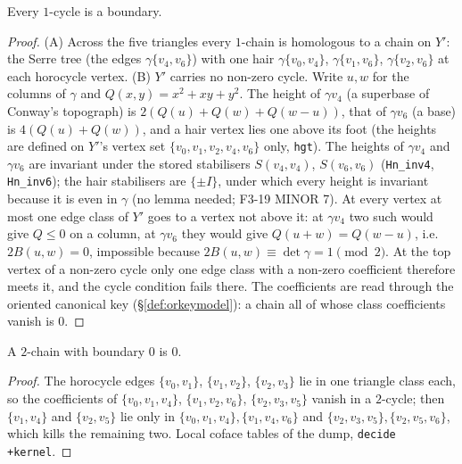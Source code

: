 \begin{lemma}[H4(ii)-(1) for the model: $H_1(X_{\mathrm{bulk}})=0$]\label{prop:model7h4-ii-1}
  \leanok
  Every $1$-cycle is a boundary.
\end{lemma}
\begin{proof}
  \leanok
  (A) Across the five triangles every $1$-chain is homologous to a chain on $Y'$: the Serre tree (the edges
  $\gamma\{v_4,v_6\}$) with one hair $\gamma\{v_0,v_4\}$, $\gamma\{v_1,v_6\}$, $\gamma\{v_2,v_6\}$ at each horocycle vertex.
  (B) $Y'$ carries no non-zero cycle. Write $u,w$ for the columns of $\gamma$ and $Q(x,y)=x^2+xy+y^2$. The height of
  $\gamma v_4$ (a superbase of Conway's topograph) is $2(Q(u)+Q(w)+Q(w-u))$, that of $\gamma v_6$ (a base) is $4(Q(u)+Q(w))$,
  and a hair vertex lies one above its foot (the heights are defined on $Y'$'s vertex set $\{v_0,v_1,v_2,v_4,v_6\}$ only,
  \texttt{hgt}). The heights of $\gamma v_4$ and $\gamma v_6$ are invariant under the stored stabilisers $S(v_4,v_4)$,
  $S(v_6,v_6)$ (\texttt{Hn\_inv4}, \texttt{Hn\_inv6}); the hair stabilisers are $\{\pm I\}$, under which every height is
  invariant because it is even in $\gamma$ (no lemma needed; F3-19 MINOR 7). At every vertex at most
  one edge class of $Y'$ goes to a vertex not above it: at $\gamma v_4$ two such would give $Q\le0$ on a column, at
  $\gamma v_6$ they would give $Q(u+w)=Q(w-u)$, i.e.\ $2B(u,w)=0$, impossible because $2B(u,w)\equiv\det\gamma=1\pmod 2$. At
  the top vertex of a non-zero cycle only one edge class with a non-zero coefficient therefore meets it, and the cycle
  condition fails there. The coefficients are read through the oriented canonical key (\S\ref{def:orkeymodel}): a chain all
  of whose class coefficients vanish is $0$.
\end{proof}

\begin{lemma}[H4(ii)-(2) for the model: $Z_2(X_{\mathrm{bulk}})=0$]\label{prop:model7h4-ii-2}
  \leanok
  A $2$-chain with boundary $0$ is $0$.
\end{lemma}
\begin{proof}
  \leanok
  The horocycle edges $\{v_0,v_1\}$, $\{v_1,v_2\}$, $\{v_2,v_3\}$ lie in one triangle class each, so the coefficients of
  $\{v_0,v_1,v_4\}$, $\{v_1,v_2,v_6\}$, $\{v_2,v_3,v_5\}$ vanish in a $2$-cycle; then $\{v_1,v_4\}$ and $\{v_2,v_5\}$ lie
  only in $\{v_0,v_1,v_4\},\{v_1,v_4,v_6\}$ and $\{v_2,v_3,v_5\},\{v_2,v_5,v_6\}$, which kills the remaining two. Local
  coface tables of the dump, \texttt{decide +kernel}.
\end{proof}

